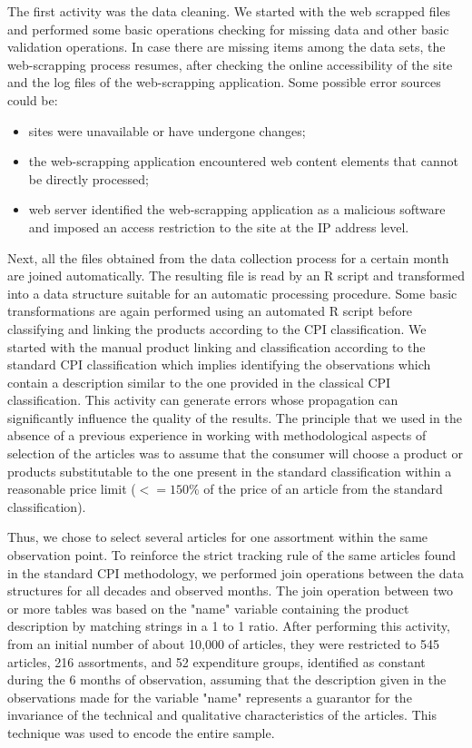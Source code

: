 \documentclass[]{article}
\begin{document}
The first activity was the data cleaning. We started with 
the web scrapped files and performed some basic operations checking for missing data and other basic validation operations. 
In case there are missing items among the data sets, the web-scrapping process resumes, after checking the online accessibility 
of the site and the log files of the web-scrapping application. Some possible error sources could be: 
\begin{itemize}
\item sites were unavailable or have undergone changes;
\item the web-scrapping application encountered web content elements that cannot be directly processed;
\item web server identified the web-scrapping application as a malicious software and imposed an access restriction to the site at the IP address level.
\end{itemize}


Next, all the files obtained from the data collection process for a certain month are joined automatically. The resulting 
file is read by an R script and transformed into a data structure suitable for an automatic processing procedure. Some 
basic transformations are again performed using an automated R script before classifying and linking the products according 
to the CPI classification. We started with the manual product linking and classification according to the standard CPI 
classification which implies identifying the observations which contain a description similar to the one provided in the
classical CPI classification. This activity can generate errors whose propagation can significantly influence the quality 
of the results. The principle that we used in the absence of a previous experience in working with methodological aspects 
of selection of the articles was to assume that the consumer will choose a product or products substitutable to the one present 
in the standard classification within a reasonable price limit ($<= 150\%$ of the price of an article from the standard classification). 

Thus, we chose to select several articles for one assortment within the same observation point. To reinforce the strict tracking 
rule of the same articles found in the standard CPI methodology, we performed join operations between the data structures 
for all decades and observed months. The join operation between two or more tables was based on the "name" variable containing 
the product description by matching strings in a 1 to 1 ratio. After performing this activity, from an initial number 
of about 10,000 of articles, they were restricted to 545 articles, 216 assortments, and 52 expenditure groups, 
identified as constant during the 6 months of observation, assuming that the description given in the observations 
made for the variable "name" represents a guarantor for the invariance of the technical and qualitative characteristics 
of the articles. This technique was used to encode the entire sample.
\end{document}
